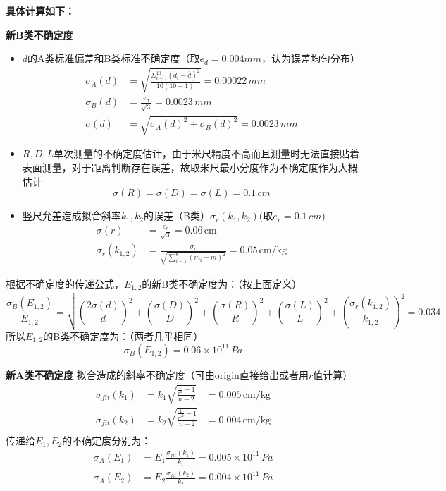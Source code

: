 \documentclass[12pt]{article}
\begin{document}
\hspace{-2em}
\textbf{具体计算如下：}\\
\par
\textbf{新B类不确定度}\\
\begin{itemize}
    \item $d$的A类标准偏差和B类标准不确定度（取$e_d=0.004mm$，认为误差均匀分布）
\[
\begin{array}{ll}
    \sigma_A(d)&=\sqrt{\frac{\Sigma_{i=1}^{10}(d_i-\overline{d})^2}{10(10-1)}}=0.00022\,mm \\[6pt]
    \sigma_B(d)&=\frac{e_d}{\sqrt{3}}=0.0023\,mm \\
    \sigma(d)&=\sqrt{\sigma_A(d)^2+\sigma_B(d)^2}=0.0023\,mm
\end{array}
\]
\item $R,D,L$单次测量的不确定度估计，由于米尺精度不高而且测量时无法直接贴着表面测量，对于距离判断存在误差，故取米尺最小分度作为不确定度作为大概估计
\[
\sigma(R)=\sigma(D)=\sigma(L)=0.1\,cm
\]
\item 竖尺允差造成拟合斜率$k_1,k_2$的误差（B类）$\sigma_{r}(k_1,k_2)$(取$e_r=0.1\,cm$)
\[
\begin{aligned}
    \sigma(r) &= \frac{e_r}{\sqrt{3}} = 0.06\,\text{cm}\\
    \sigma_{r}(k_{1,2}) &= \frac{\sigma_r}{\sqrt{\sum\limits_{i=1}^{8}(m_i-\overline{m})^2}} = 0.05\,\text{cm/kg}
\end{aligned}
\]
\end{itemize}
根据不确定度的传递公式，$E_{1,2}$的新B类不确定度为：（按上面定义）
\[
\frac{\sigma_B(E_{1,2})}{E_{1,2}}=\sqrt{(\frac{2\sigma(d)}{d})^2+(\frac{\sigma(D)}{D})^2+(\frac{\sigma(R)}{R})^2+(\frac{\sigma(L)}{L})^2+(\frac{\sigma_{r}(k_{1,2})}{k_{1,2}})^2}=0.034
\]
所以$E_{1,2}$的B类不确定度为：（两者几乎相同）\\
\[
\sigma_B(E_{1,2})=0.06\times 10^{11}\,Pa
\]
\par
\vspace{1em} 
\textbf{新A类不确定度}
拟合造成的斜率不确定度（可由origin直接给出或者用$r$值计算）
\[
\begin{aligned}
    \sigma_{fit}(k_1)&=k_1\sqrt{\frac{\frac{1}{r^2}-1}{n-2}}&=0.005\,\text{cm/kg}\\
    \sigma_{fit}(k_2)&=k_2\sqrt{\frac{\frac{1}{r'^2}-1}{n-2}}&=0.004\,\text{cm/kg}\\
\end{aligned}
\]
传递给$E_1,E_2$的不确定度分别为：
\[
\begin{aligned}
    \sigma_A(E_1)&=E_1\frac{\sigma_{fit}(k_1)}{k_1}=0.005\times 10^{11}\,Pa\\
    \sigma_A(E_2)&=E_2\frac{\sigma_{fit}(k_2)}{k_2}=0.004\times 10^{11}\,Pa
\end{aligned}
\]
\end{document}
